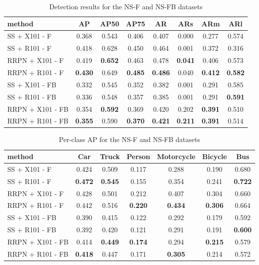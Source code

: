 \documentclass{article}
\newcommand{\datasetF}{NS-F }
\newcommand{\datasetFB}{NS-FB }
\begin{document}
\begin{table}[t!]
\scriptsize
\centering
\caption{Detection results for the  \datasetF and \datasetFB datasets}
\setlength\tabcolsep{3pt}
\begin{tabular}{l|c|c|c|c|c|c|c}
    method & AP & AP50 & AP75 & AR & ARs & ARm & ARl\\
    \hline\hline
    SS + X101 - F & 0.368 & 0.543 & 0.406 & 0.407 & 0.000 & 0.277 & 0.574\\
    SS + R101 - F & 0.418 & 0.628 & 0.450 & 0.464 & 0.001 & 0.372 & 0.316\\
    RRPN + X101 - F & 0.419 & \textbf{0.652} & 0.463 & 0.478 & \textbf{0.041} & 0.406 & 0.573\\
    RRPN + R101 - F & \textbf{0.430} & 0.649 & \textbf{0.485} & \textbf{0.486} & 0.040 & \textbf{0.412} & \textbf{0.582}\\
    \hline
    SS + X101 - FB& 0.332 & 0.545 & 0.352 & 0.382 & 0.001 & 0.291 & 0.585\\
    SS + R101 - FB& 0.336 & 0.548 & 0.357 & 0.385 & 0.001 & 0.291 & \textbf{0.591}\\
    RRPN + X101 - FB& 0.354 & \textbf{0.592} & 0.369 & 0.420 & 0.202 & \textbf{0.391} & 0.510\\
    RRPN + R101 - FB& \textbf{0.355} & 0.590 & \textbf{0.370} & \textbf{0.421} & \textbf{0.211} & \textbf{0.391} & 0.514\\
\end{tabular}
\label{table:res}
\end{table}

\begin{table}[t!]
\scriptsize
\centering
\caption{Per-class AP for the \datasetF and \datasetFB datasets}
\setlength\tabcolsep{3pt}
\begin{tabular}{l|c|c|c|c|c|c}
    method & Car & Truck & Person & Motorcycle & Bicycle & Bus \\
    \hline\hline
    SS + X101 - F & 0.424 & 0.509 & 0.117 & 0.288 & 0.190 & 0.680\\
    SS + R101 - F& \textbf{0.472} & \textbf{0.545} & 0.155 & 0.354 & 0.241 & \textbf{0.722}\\
    RRPN + X101 - F & 0.428 & 0.501 & 0.212 & 0.407 & 0.304 & 0.660\\
    RRPN + R101 - F& 0.442 & 0.516 & \textbf{0.220} & \textbf{0.434} & \textbf{0.306} & 0.664\\
    \hline
    SS + X101 - FB& 0.390 & 0.415 & 0.122 & 0.292 & 0.179 & 0.592\\
    SS + R101 - FB& 0.392 & 0.420 & 0.121 & 0.291 & 0.191 & \textbf{0.600}\\
    RRPN + X101 - FB& 0.414 & \textbf{0.449} & \textbf{0.174} & 0.294 & \textbf{0.215} & 0.579\\
    RRPN + R101 - FB& \textbf{0.418} & 0.447 & 0.171 & \textbf{0.305} & 0.214 & 0.572\\
\end{tabular}
\label{table:clss}
\end{table}
\end{document}
